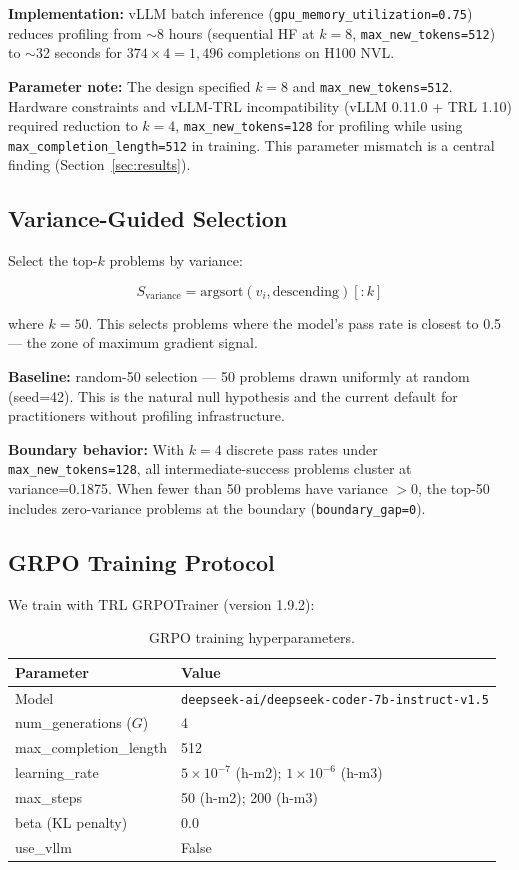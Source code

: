 \textbf{Implementation:} vLLM batch inference (\texttt{gpu\_memory\_utilization=0.75}) reduces profiling from $\sim$8 hours (sequential HF at $k=8$, \texttt{max\_new\_tokens=512}) to $\sim$32 seconds for $374\times4=1{,}496$ completions on H100 NVL.

\textbf{Parameter note:} The design specified $k=8$ and \texttt{max\_new\_tokens=512}. Hardware constraints and vLLM-TRL incompatibility (vLLM 0.11.0 + TRL 1.10) required reduction to $k=4$, \texttt{max\_new\_tokens=128} for profiling while using \texttt{max\_completion\_length=512} in training. This parameter mismatch is a central finding (Section~\ref{sec:results}).

\subsection{Variance-Guided Selection}

Select the top-$k$ problems by variance:

\begin{equation}
S_{\mathrm{variance}} = \mathrm{argsort}(v_i, \text{descending})[:k]
\end{equation}

where $k=50$. This selects problems where the model's pass rate is closest to 0.5 --- the zone of maximum gradient signal.

\textbf{Baseline:} random-50 selection --- 50 problems drawn uniformly at random (seed=42). This is the natural null hypothesis and the current default for practitioners without profiling infrastructure.

\textbf{Boundary behavior:} With $k=4$ discrete pass rates under \texttt{max\_new\_tokens=128}, all intermediate-success problems cluster at variance=0.1875. When fewer than 50 problems have variance $> 0$, the top-50 includes zero-variance problems at the boundary (\texttt{boundary\_gap=0}).

\subsection{GRPO Training Protocol}

We train with TRL GRPOTrainer (version 1.9.2):

\begin{table}[h]
\centering
\caption{GRPO training hyperparameters.}
\label{tab:training}
\begin{tabular}{ll}
\toprule
Parameter & Value \\
\midrule
Model & \texttt{deepseek-ai/deepseek-coder-7b-instruct-v1.5} \\
num\_generations ($G$) & 4 \\
max\_completion\_length & 512 \\
learning\_rate & $5\times10^{-7}$ (h-m2); $1\times10^{-6}$ (h-m3) \\
max\_steps & 50 (h-m2); 200 (h-m3) \\
beta (KL penalty) & 0.0 \\
use\_vllm & False \\
\bottomrule
\end{tabular}
\end{table}

